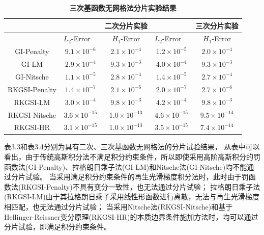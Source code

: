    \begin{table}[h]
    \caption{\textbf{三次基函数无网格法分片实验结果}}
    \centering
   \begin{tabular}{ccccc}
   \toprule
   &$\quad$ &二次分片实验 &$\quad$ &三次分片实验\\
   \midrule
   &$L_2$-Error$\quad$&$H_1$-Error&$L_2$-Error$\quad$&$H_1$-Error\\
   \midrule
   GI-Penalty&$9.1\times10^{-6}$&$2.1\times10^{-4}$&$1.2\times10^{-5}$&$2.0\times10^{-4}$\\
   GI-LM&$2.9\times10^{-4}$&$9.3\times10^{-3}$&$4.0\times10^{-4}$&$9.3\times10^{-3}$\\
   GI-Nitsche&$1.1\times10^{-5}$&$2.8\times10^{-4}$&$1.4\times10^{-5}$&$2.7\times10^{-4}$\\
  RKGSI-Penalty&$1.4\times10^{-7}$&$2.1\times10^{-6}$&$2.0\times10^{-7}$&$2.7\times10^{-6}$\\
  RKGSI-LM&$3.0\times10^{-4}$&$9.8\times10^{-3}$&$4.2\times10^{-4}$&$9.8\times10^{-3}$\\
  RKGSI-Nitsche&$3.6\times10^{-15}$&$1.0\times10^{-13}$&$4.6\times10^{-15}$&$9.5\times10^{-14}$\\
  RKGSI-HR&$3.1\times10^{-15}$&$1.0\times10^{-13}$&$3.5\times10^{-15}$&$7.4\times10^{-14}$\\
   \bottomrule
   \end{tabular}
   \end{table}\newpage
表3.3和表3.4分别为具有二次、三次基函数无网格法的分片试验结果，
从表中可以看出，由于传统高斯积分法不满足积分约束条件，所以即使采用高阶高斯积分的罚函数法(GI-Penalty)、拉格朗日乘子法(GI-LM)和Nitsche法(GI-Nitsche)均不能通过分片试验。
当采用满足积分约束条件的再生光滑梯度积分法时，此时由于罚函数法(RKGSI-Penalty)不具有变分一致性，也无法通过分片试验；
拉格朗日乘子法(RKGSI-LM)由于其拉格朗日乘子采用线性形函数进行离散，无法与再生光滑梯度相匹配，也无法通过分片试验；
当采用Nitsche法(RKGSI-Nitsche)和基于Hellinger-Reissner变分原理(RKGSI-HR)的本质边界条件施加方法时，均可以通过分片试验，即满足积分约束条件。

